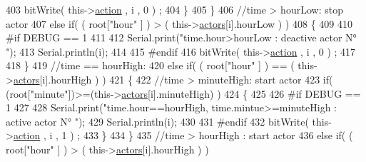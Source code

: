 \begin{DoxyCode}
403                                     bitWrite( this->\hyperlink{class_jetpack_aca3142925a7b0834b34ae91d26af7765}{action} , i , 0 ) ;
404                                 \}   
405                             \}
406                             \textcolor{comment}{//time > hourLow: stop actor}
407                             \textcolor{keywordflow}{else} \textcolor{keywordflow}{if}( ( root[\textcolor{stringliteral}{"hour"} ] ) > ( this->\hyperlink{class_jetpack_a7e16d2f97837f9712a2e6de1c50d99db}{actors}[i].hourLow ) )
408                             \{
409     
410 \textcolor{preprocessor}{                            #if DEBUG == 1 }
411                         
412                                 Serial.print(\textcolor{stringliteral}{"time.hour>hourLow : deactive actor N° "});
413                                 Serial.println(i);
414                 
415 \textcolor{preprocessor}{                            #endif      }
416                                 bitWrite( this->\hyperlink{class_jetpack_aca3142925a7b0834b34ae91d26af7765}{action} , i , 0 ) ;
417                                                     
418                             \}
419                             \textcolor{comment}{//time == hourHigh:}
420                             \textcolor{keywordflow}{else} \textcolor{keywordflow}{if}( ( root[\textcolor{stringliteral}{"hour"} ] ) == ( this->\hyperlink{class_jetpack_a7e16d2f97837f9712a2e6de1c50d99db}{actors}[i].hourHigh ) )
421                             \{
422                                 \textcolor{comment}{//time > minuteHigh: start actor}
423                                 \textcolor{keywordflow}{if}( (root[\textcolor{stringliteral}{"minute"}])>=(this->\hyperlink{class_jetpack_a7e16d2f97837f9712a2e6de1c50d99db}{actors}[i].minuteHigh) )
424                                 \{
425                         
426 \textcolor{preprocessor}{                                #if DEBUG == 1 }
427                         
428                                     Serial.print(\textcolor{stringliteral}{"time.hour==hourHigh, time.mintue>=minuteHigh : active
       actor N° "});
429                                     Serial.println(i);
430                         
431 \textcolor{preprocessor}{                                #endif}
432                                     bitWrite( this->\hyperlink{class_jetpack_aca3142925a7b0834b34ae91d26af7765}{action} , i , 1 ) ;
433                                 \}                   
434                             \}
435                             \textcolor{comment}{//time > hourHigh : start actor}
436                             \textcolor{keywordflow}{else} \textcolor{keywordflow}{if}( ( root[\textcolor{stringliteral}{"hour"} ] ) > ( this->\hyperlink{class_jetpack_a7e16d2f97837f9712a2e6de1c50d99db}{actors}[i].hourHigh ) )

\end{DoxyCode}
